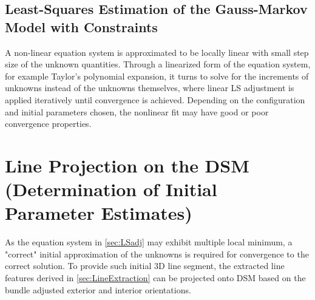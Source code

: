 \subsection{Least-Squares Estimation of the Gauss-Markov Model with Constraints}
\label{subsec:LSadj}
A non-linear equation system is approximated to be locally linear with small step size of the unknown quantities. Through a linearized form of the equation system, for example Taylor's polynomial expansion, it turns to solve for the increments of unknowns instead of the unknowns themselves, where linear LS adjustment is applied iteratively until convergence is achieved. Depending on the configuration and initial parameters chosen, the nonlinear fit may have good or poor convergence properties.














\section{Line Projection on the DSM (Determination of Initial Parameter Estimates)}
\label{sec:LineProjectionOnDSM}

As the equation system in \cref{sec:LSadj} may exhibit multiple local minimum, a "correct" initial approximation of the unknowns is required for convergence to the correct solution. To provide such initial 3D line segment, the extracted line features derived in \cref{sec:LineExtraction} can be projected onto DSM based on the bundle adjusted exterior and interior orientations.

